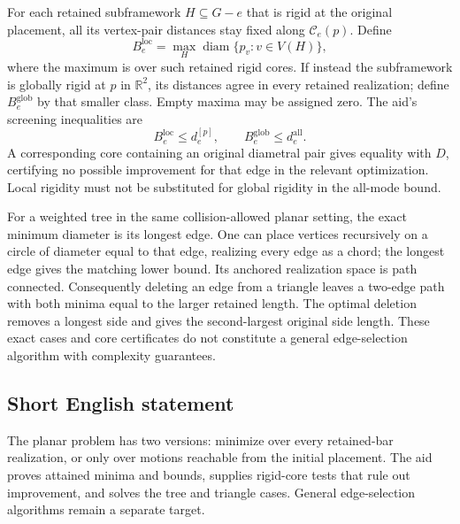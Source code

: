 \documentclass[11pt]{article}
\newcommand{\R}{\mathbb{R}}
\begin{document}
For each retained subframework \(H\subseteq G-e\) that is rigid at the original placement, all its vertex-pair distances stay fixed along \(\mathcal C_e(p)\). Define
\[
 B_e^{\mathrm{loc}}=\max_H\operatorname{diam}\{p_v:v\in V(H)\},
\]
where the maximum is over such retained rigid cores. If instead the subframework is globally rigid at \(p\) in \(\R^2\), its distances agree in every retained realization; define \(B_e^{\mathrm{glob}}\) by that smaller class. Empty maxima may be assigned zero. The aid's screening inequalities are
\[
 B_e^{\mathrm{loc}}\leq d_e^{[p]},\qquad
 B_e^{\mathrm{glob}}\leq d_e^{\mathrm{all}}.
\]
A corresponding core containing an original diametral pair gives equality with \(D\), certifying no possible improvement for that edge in the relevant optimization. Local rigidity must not be substituted for global rigidity in the all-mode bound.

For a weighted tree in the same collision-allowed planar setting, the exact minimum diameter is its longest edge. One can place vertices recursively on a circle of diameter equal to that edge, realizing every edge as a chord; the longest edge gives the matching lower bound. Its anchored realization space is path connected. Consequently deleting an edge from a triangle leaves a two-edge path with both minima equal to the larger retained length. The optimal deletion removes a longest side and gives the second-largest original side length. These exact cases and core certificates do not constitute a general edge-selection algorithm with complexity guarantees.
\subsection{Short English statement}
The planar problem has two versions: minimize over every retained-bar realization, or only over motions reachable from the initial placement. The aid proves attained minima and bounds, supplies rigid-core tests that rule out improvement, and solves the tree and triangle cases. General edge-selection algorithms remain a separate target.
\end{document}

